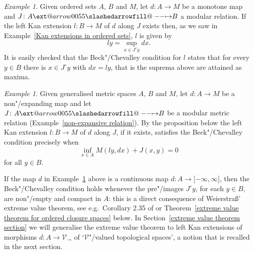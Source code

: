 \documentclass[preprint, a4paper]{elsarticle}
\makeatletter
\def\slashedarrowfill@#1#2#3#4#5{%
  $\m@th\thickmuskip0mu\medmuskip\thickmuskip\thinmuskip\thickmuskip
   \relax#5#1\mkern-7mu%
   \cleaders\hbox{$#5\mkern-2mu#2\mkern-2mu$}\hfill
   \mathclap{#3}\mathclap{#2}%
   \cleaders\hbox{$#5\mkern-2mu#2\mkern-2mu$}\hfill
   \mkern-7mu#4$%
}
\def\rightslashedarrowfill@{%
  \slashedarrowfill@\relbar\relbar\mapstochar\rightarrow}
\newcommand\xslashedrightarrow[2][]{%
  \ext@arrow 0055{\rightslashedarrowfill@}{#1}{#2}}
\def\slashedrightarrow{\xslashedrightarrow{}}
\newcommand{\dashcirc}{\multimap}
\theoremstyle{definition}
\theoremstyle{remark}
\newtheorem{example}[theorem]{Example}
\providecommand{\exref}[1]{Example~\ref{#1}}
\providecommand{\thmref}[1]{Theorem~\ref{#1}}
\providecommand{\secref}[1]{Section~\ref{#1}}
\providecommand{\brks}[1]{\lbrack #1 \rbrack}
\providecommand{\rev}[1]{#1^\circ}
\providecommand{\map}[3]{#1\colon#2\to#3}
\providecommand{\hmap}[3]{#1\colon#2\slashedrightarrow#3}
\providecommand{\catvar}[1]{\mathcal{#1}}
\providecommand{\2}{\mathsf 2}
\providecommand{\V}{\catvar V}
\makeatother
\begin{document}
  \begin{example} \label{Beck-Chevalley for ordered sets}
  	Given ordered sets $A$, $B$ and $M$, let $\map dAM$ be a monotone map and $\hmap JAB$ a modular relation. If the left Kan extension $\map lBM$ of $d$ along $J$ exists then, as we saw in \exref{Kan extensions in ordered sets}, $l$ is given by
  	\begin{displaymath}
  		ly = \sup_{x \in \rev Jy} dx.
  	\end{displaymath}
  	It is easily checked that the Beck"/Chevalley condition for $l$ states that for every $y \in B$ there is $x \in \rev Jy$ with $dx = ly$, that is the suprema above are attained as maxima.
  \end{example}
  \begin{example} \label{Beck-Chevalley for metric spaces}
  	Given generalised metric spaces $A$, $B$ and $M$, let $\map dAM$ be a non"/expanding map and let $\hmap JAB$ be a modular metric relation (\exref{non-expansive relation}). By the proposition below the left Kan extension $\map lBM$ of $d$ along $J$, if it exists, satisfies the Beck"/Chevalley condition precisely when
  	\begin{displaymath}
  		\inf_{x \in A} M(ly, dx) + J(x, y) = 0
  	\end{displaymath}
  	for all $y \in B$.
  \end{example}
  
  If the map $d$ in \exref{Beck-Chevalley for ordered sets} above is a continuous map $\map dA\brks{-\infty, \infty}$, then the Beck"/Chevalley condition holds whenever the pre"/images $\rev Jy$, for each $y \in B$, are non"/empty and compact in $A$: this is a direct consequence of Weierstra\ss' extreme value theorem, see e.g.\ Corollary 2.35 of \cite{Aliprantis-Border06} or \thmref{extreme value theorem for ordered closure spaces} below. In \secref{extreme value theorem section} we will generalise the extreme value theorem to left Kan extensions of morphisms $\map dA{\V_{\dashcirc}}$ of `$\V$"/valued topological spaces', a notion that is recalled in the next section.
  
\end{document}
